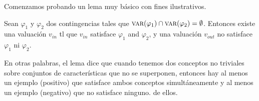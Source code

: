 Comenzamos probando un lema muy básico con fines ilustrativos.
\begin{lemma}\label{lemma:InterseccionUnionConceptos}
Sean $\varphi_1$ y $\varphi_2$ dos contingencias tales que $\textsc{var}(\varphi_1) \cap  \textsc{var}(\varphi_2) = \emptyset$. Entonces existe una valuación $v_{in}$ tl que $v_{in}$ satisface $\varphi_1$ and $\varphi_2$, y una valuación $v_{out}$ no satisface $\varphi_1$ ni $\varphi_2$.
\end{lemma}
En otras palabras, el lema dice que cuando tenemos dos conceptos no triviales sobre conjuntos de características que no se superponen, entonces hay al menos un ejemplo (positivo) que satisface ambos conceptos simultáneamente y al menos un ejemplo (negativo) que no satisface ninguno. de ellos.

